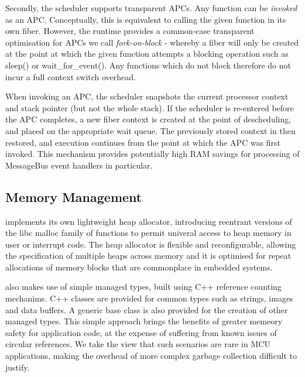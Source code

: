 Secondly, the \CO scheduler supports transparent APCs. Any function can be \emph{invoked} as an APC. Conceptually, this is equivalent to calling the given function in its own fiber. However, the \CO runtime provides a common-case transparent optimisation for APCs we call \emph{fork-on-block} - whereby a fiber will only be created at the point at which the given function attempts a blocking operation such as sleep() or wait\_for\_event(). Any functions which do not block therefore do not incur a full context switch overhead.

When invoking an APC, the scheduler snapshots the current processor context and stack pointer (but not the whole stack). If the scheduler is re-entered before the APC completes, a new fiber context is created at the point of descheduling, and placed on the appropriate wait queue. The previously stored context in then restored, and execution continues from the point at which the APC was first invoked. This mechanism provides potentially high RAM savings for processing of MessageBus event handlers in particular.

\subsection{Memory Management}
\CO implements its own lightweight heap allocator, introducing reentrant versions of the libc malloc family of functions to permit univeral access to heap memory in user or interrupt code. The heap allocator is flexible and reconfigurable, allowing the specification of multiple heaps across memory and it is optimised for repeat allocations of memory blocks that are commonplace in embedded systems.

\CO also makes use of simple managed types, built using C++ reference counting mechanims. C++ classes are provided for common types such as strings, images and data buffers. A generic base class is also provided for the creation of other managed types. This simple approach brings the benefits of greater memeory safety for application code, at the expense of suffering from known issues of circular references. We take the view that such scenarios are rare in MCU applications, making the overhead of more complex garbage collection difficult to justify.

